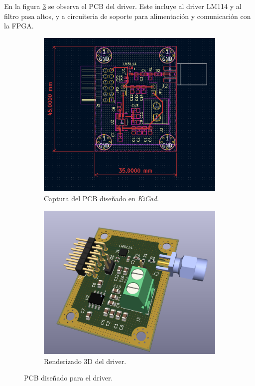 En la figura \ref{fig:driver_pcb} se observa el PCB del driver. Este incluye al
driver LM114 y al filtro pasa altos, y a circuiteria de soporte para
alimentación y comunicación con la FPGA.

\begin{figure}
    \centering

    \begin{subfigure}[b]{0.45\textwidth}
        \includegraphics[width=\textwidth]{images/driver_pcb.png}
        \caption{Captura del PCB diseñado en \textit{KiCad}.}
        \label{fig:driver_layout}
    \end{subfigure}
    \hfill
    \begin{subfigure}[b]{0.45\textwidth}
        \includegraphics[width=\textwidth]{images/driver_3d_render.png}
        \caption{Renderizado 3D del driver.}
        \label{fig:driver_3d}
    \end{subfigure}

    \caption{PCB diseñado para el driver.}
    \label{fig:driver_pcb}
\end{figure}

